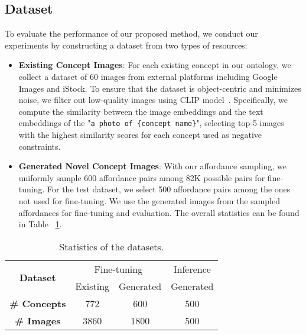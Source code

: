 \subsection{Dataset}
\label{app:dataset}
To evaluate the performance of our proposed method, we conduct our experiments by constructing a dataset from two types of resources:
\begin{itemize}
    \item \textbf{Existing Concept Images}: For each existing concept in our ontology, we collect a dataset of 60 images from external platforms including Google Images and iStock. To ensure that the dataset is object-centric and minimizes noise, we filter out low-quality images using CLIP model~\citep{radford2021learningtransferablevisualmodels}. Specifically, we compute the similarity between the image embeddings and the text embeddings of the "\texttt{a photo of \{concept name\}}", selecting top-5 images with the highest similarity scores for each concept used as negative constraints. %
    \item \textbf{Generated Novel Concept Images}: With our affordance sampling, we uniformly sample 600 affordance pairs among 82K possible pairs for fine-tuning. For the test dataset, we select 500 affordance pairs among the ones not used for fine-tuning. We use the generated images from the sampled affordances for fine-tuning and evaluation.
    The overall statistics can be found in Table ~\ref{app:dataset_stats}.
\end{itemize}
\begin{table}[ht]
    \centering
    \begin{tabular}{cccc}
    \midrule
    \multirow{2}{*}{\textbf{Dataset}} & \multicolumn{2}{c}{Fine-tuning} & Inference \\
    \cmidrule{2-3}
    & Existing & Generated & Generated \\
    \midrule
    \textbf{\# Concepts} & 772 & 600 & 500 \\
    \textbf{\# Images} & 3860 & 1800 & 500 \\
    \bottomrule
    \end{tabular}%
    \caption{Statistics of the datasets.
    }
    \label{app:dataset_stats}
\end{table}


